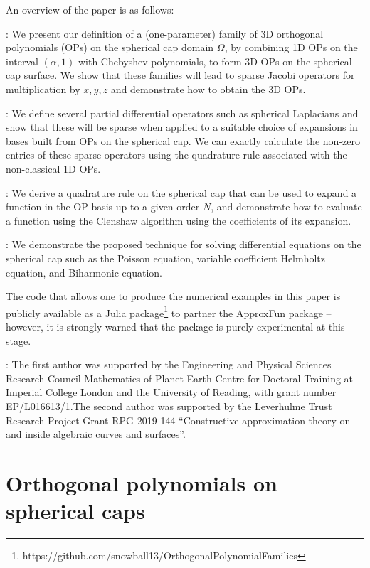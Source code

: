 \documentclass[11pt, oneside]{article}   	%
\begin{document}
An overview of the paper is as follows:  

\noindent {}: We present our definition of a (one-parameter) family of 3D orthogonal polynomials (OPs) on the spherical cap domain $\Omega$, by combining 1D OPs on the interval $(\alpha, 1)$ with Chebyshev polynomials, to form 3D OPs on the spherical cap surface. We show that these families will lead to sparse Jacobi operators for multiplication by $x, y, z$ and demonstrate how to obtain the 3D OPs.

\noindent{}: We define several partial differential operators such as spherical Laplacians and  show that these will  be sparse when applied to a suitable choice of expansions in bases built from OPs on the spherical cap. We can exactly calculate the non-zero entries of these sparse operators using the quadrature rule associated with the non-classical 1D OPs.

\noindent{}: We derive a quadrature rule on the spherical cap that can be used to expand a function in the OP basis up to a given order $N$, and demonstrate how to evaluate a function using the Clenshaw algorithm using the coefficients of its expansion.

\noindent{}: We demonstrate the proposed technique for solving differential equations on the spherical cap such as the Poisson equation, variable coefficient Helmholtz equation, and Biharmonic equation.  

The code that allows one to produce the numerical examples in this paper is publicly available as a Julia package\footnote{https://github.com/snowball13/OrthogonalPolynomialFamilies} to partner the ApproxFun package \cite{ApproxFun} -- however, it is strongly warned that the package is purely experimental at this stage.

: The first author was supported by the Engineering and Physical Sciences Research Council Mathematics of Planet Earth Centre for Doctoral Training at Imperial College London and the University of Reading, with grant number EP/L016613/1.The second author was supported by the Leverhulme Trust Research Project Grant RPG-2019-144 ``Constructive approximation theory on and inside algebraic curves and surfaces''.



\section{Orthogonal polynomials on spherical caps}\label{Section:OPs}
\end{document}
